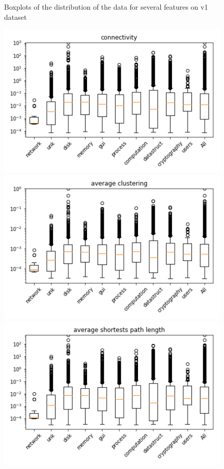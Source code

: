 \begin{appendices}
\begin{figure}[H]
\caption{Boxplots of the distribution of the data for several features on v1 dataset}\label{fig:distribution_analysis2}
\end{figure}




\begin{figure}[H]

%
\centering
\includegraphics[width=0.9\linewidth]{img/boxplots/v1_unbalanced_connectivity.png}
\endminipage
{}%
\centering
\includegraphics[width=0.9\linewidth]{img/boxplots/v1_unbalanced_average_clustering.png}
\endminipage
{}%
\centering
\includegraphics[width=0.9\linewidth]{img/boxplots/v1_unbalanced_average_shortests_path_length.png}
\endminipage


\end{figure}
\end{appendices}
